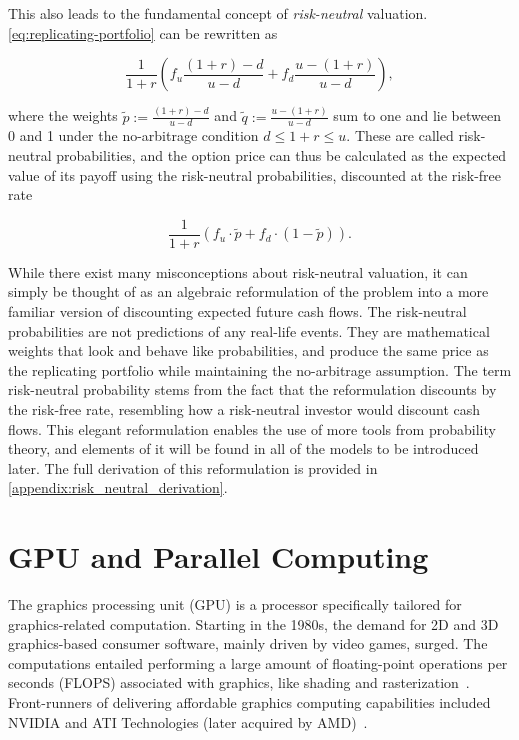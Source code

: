 \documentclass[english,12pt,a4paper,pdftex,sci,utf8]{aaltothesis}
\begin{document}
This also leads to the fundamental concept of \emph{risk-neutral} valuation. \cref{eq:replicating-portfolio} can be rewritten as

\begin{equation*}
     \frac{1}{1+r}\left(f_u\frac{(1+r)-d}{u-d}+f_d\frac{u-(1+r)}{u-d}\right),
\end{equation*}

where the weights $\tilde{p} := \frac{(1+r)-d}{u-d}$ and $\tilde{q} := \frac{u-(1+r)}{u-d}$ sum to one and lie between 0 and 1 under the no-arbitrage condition $d \leq 1+r \leq u$. These are called risk-neutral probabilities, and the option price can thus be calculated as the expected value of its payoff using the risk-neutral probabilities, discounted at the risk-free rate

\begin{equation}
     \frac{1}{1+r}(f_u\cdot \tilde p + f_d \cdot (1-\tilde p)).
\label{eq:risk-neutral-expectancy}
\end{equation}

While there exist many misconceptions about risk-neutral valuation, it can simply be thought of as an algebraic reformulation of the problem into a more familiar version of discounting expected future cash flows. The risk-neutral probabilities are not predictions of any real-life events. They are mathematical weights that look and behave like probabilities, and produce the same price as the replicating portfolio while maintaining the no-arbitrage assumption. The term risk-neutral probability stems from the fact that the reformulation discounts by the risk-free rate, resembling how a risk-neutral investor would discount cash flows. This elegant reformulation enables the use of more tools from probability theory, and elements of it will be found in all of the models to be introduced later. The full derivation of this reformulation is provided in \cref{appendix:risk_neutral_derivation}. \cite{gisiger2010risk, tham2001risk}

\clearpage

\section{GPU and Parallel Computing}\label{sec:gpu}
The graphics processing unit (GPU) is a processor specifically tailored for graphics-related computation. Starting in the 1980s, the demand for 2D and 3D graphics-based consumer software, mainly driven by video games, surged. The computations entailed performing a large amount of floating-point operations per seconds (FLOPS) associated with graphics, like shading and rasterization~\cite{sanders2010cuda, kirk2016programming}. Front-runners of delivering affordable graphics computing capabilities included NVIDIA and ATI Technologies (later acquired by AMD)~\cite{sanders2010cuda}.
\end{document}
